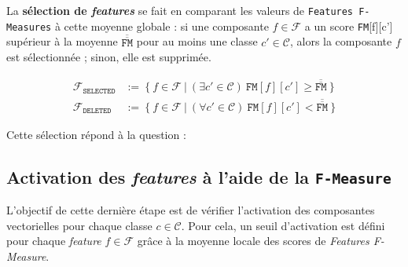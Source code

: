 		
		La \textbf{sélection de \textit{features}} se fait en comparant les valeurs de \texttt{Features F-Measures} à cette moyenne globale : si une composante $f \in \mathcal{F}$ a un score \texttt{FM}[f][c'] supérieur à la moyenne $\overline{\overline{\texttt{FM}}}$ pour au moins une classe $c' \in \mathcal{C}$, alors la composante $f$ est sélectionnée ; sinon, elle est supprimée.
		
		\begin{equation}
			\label{equation:C.3.2-DESCRIPTION-IMPLEMENTATION-FEATURES-MAXIMIZATION-METRIC-FEATURES-SELECTION}
			\begin{array}{ll}
				\mathcal{F}_{\texttt{SELECTED}}
					& :=~\bigl\{~
						f \in \mathcal{F}
						~\big|~
						(\exists c' \in \mathcal{C})~\texttt{FM}[f][c'] \geq \overline{\overline{\texttt{FM}}}
					~\bigr\} \\
				\mathcal{F}_{\texttt{DELETED}}
					& :=~\bigl\{~
						f \in \mathcal{F}
						~\big|~
						(\forall c' \in \mathcal{C})~\texttt{FM}[f][c'] < \overline{\overline{\texttt{FM}}}
					~\bigr\}
			\end{array}
		\end{equation}
		
		\begin{leftBarAuthorOpinion}
			Cette sélection répond à la question :
		\end{leftBarAuthorOpinion}
	
	
	\subsection{Activation des \textit{features} à l'aide de la \texttt{F-Measure}}
	\label{annex:C.3.3-DESCRIPTION-IMPLEMENTATION-FEATURES-MAXIMIZATION-METRIC-ACTIVATION-FEATURES}
	
		L'objectif de cette dernière étape est de vérifier l'activation des composantes vectorielles pour chaque classe $c \in \mathcal{C}$.
		Pour cela, un seuil d'activation est défini pour chaque \textit{feature} $f \in \mathcal{F}$ grâce à la moyenne locale des scores de \textit{Features F-Measure}.
		\newline
		
